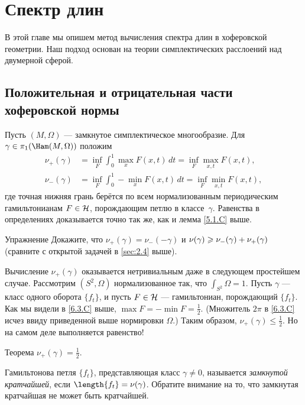 \chapter{Спектр длин}\label{chap:9}

В этой главе мы опишем метод вычисления спектра длин в хоферовской геометрии.
Наш подход основан на теории симплектических расслоений над двумерной сферой.

\section{Положительная и отрицательная части хоферовской нормы}

Пусть $(M, \Omega)$ --- замкнутое симплектическое многообразие.
Для $\gamma \in \pi_1 (\Ham(M, \Omega))$ положим \index[symb]{$\nu_\pm$}
\begin{align*}
\nu_+ (\gamma) &= \inf_F \int_0^1 \max_x F (x, t)\,dt = \inf_F \max_{x,t}F (x, t),
\\ 
\nu_- (\gamma) &= \inf_F \int_0^1 -\min_x F (x, t)\,dt = \inf_F \min_{x,t}F (x, t),
\end{align*}
где точная нижняя грань берётся по всем нормализованным периодическим
гамильтонианам $F \in \mathcal{H}$, порождающим петлю в классе~$\gamma$. 
Равенства в определениях доказывается точно так же, как и лемма \ref{5.1.C} выше.

\begin{ex*}{Упражнение}
Докажите, что $\nu_+ (\gamma) = \nu_- (-\gamma)$ и $\nu(\gamma) \z\ge
\nu_- (\gamma) + \nu_+ (\gamma)$ 
(сравните с открытой задачей в \ref{sec:2.4} выше).
\end{ex*}

Вычисление $\nu_+ (\gamma)$ оказывается нетривиальным даже в следующем
простейшем случае. 
Рассмотрим $(S^2, \Omega)$ нормализованное так, что $\int_{S^2} \Omega = 1$.
Пусть $\gamma$ --- класс одного оборота $\{f_t\}$, и пусть $F \in \mathcal{H}$
--- гамильтониан, порождающий $\{f_t\}$. 
Как мы видели в \ref{6.3.C} выше,  $\max F = - \min F = \frac12$.
(Множитель $2\pi$ в \ref{6.3.C} исчез ввиду приведенной выше
нормировки $\Omega$.) 
Таким образом, $\nu_+ (\gamma) \le \frac12$.
Но на самом деле выполняется равенство!

\begin{thm}{Теорема}\label{9.1.A}
$\nu_+ (\gamma) = \frac12$.
\end{thm}

Гамильтонова петля $\{f_t \}$, представляющая класс $\gamma \ne 0$,
называется \emph{замкнутой кратчайшей}, если $\length\{f_t \} =
\nu(\gamma)$.
Обратите внимание на то, что замкнутая кратчайшая не может быть
кратчайшей.

